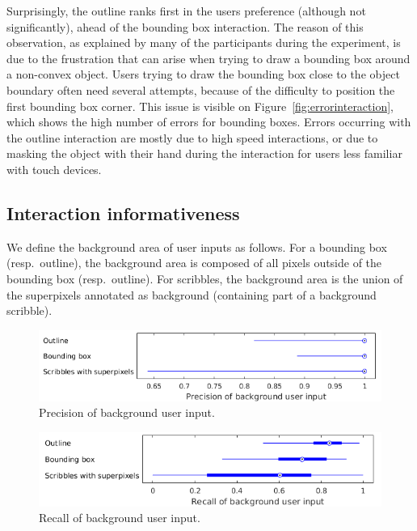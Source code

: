 Surprisingly, the outline ranks first in the users preference
(although not significantly), ahead of the bounding box interaction.
The reason of this observation, as explained by many of the participants
during the experiment, is due to the frustration
that can arise when trying to draw a bounding box
around a non-convex object.
Users trying to draw the bounding box close
to the object boundary often need several attempts,
because of the difficulty to position the first bounding box corner.
This issue is visible on Figure~\ref{fig:errorinteraction},
which shows the high number of errors for bounding boxes.
Errors occurring with the outline interaction are mostly due
to high speed interactions,
or due to masking the object with their hand during the interaction
for users less familiar with touch devices.


\subsection{Interaction informativeness}


We define the background area of user inputs as follows.
For a bounding box (resp.\ outline), the background area is composed
of all pixels outside of the bounding box (resp.\ outline).
For scribbles, the background area is the union of the superpixels
annotated as background (containing part of a background scribble).


\begin{figure}[ht]
\includegraphics[width=\columnwidth]{assets/plot/precision_bg_all.png}
\caption{Precision of background user input.}%
\label{fig:precision_bg}
\end{figure}


\begin{figure}[ht]
\includegraphics[width=\columnwidth]{assets/plot/recall_bg_all.png}
\caption{Recall of background user input.}%
\label{fig:recall_bg}
\end{figure}


